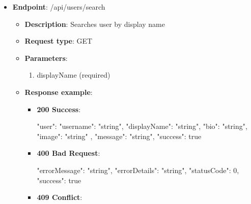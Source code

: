 \begin{itemize}
\begin{itemize}
\begin{itemize}
            \begin{spverbatim}
            {
                "errorMessage": "string",
                "errorDetails": "string",
                "statusCode": 0,
                "success": true
            }
            \end{spverbatim}
            \item \textbf{409 Conflict}:
            \begin{spverbatim}
            {
                "errorMessage": "string",
                "errorDetails": "string",
                "statusCode": 0,
                "success": true
            }
            \end{spverbatim}
        \end{itemize}
        \item \textbf{Response messages}:
        \begin{enumerate}
            \item Success.
            \item User not found.
        \end{enumerate}
    \end{itemize}
    \item \textbf{Endpoint}: /api/users/search
    \begin{itemize}
        \item \textbf{Description}: Searches user by display name
        \item \textbf{Request type}: GET
        \item \textbf{Parameters}:
        \begin{enumerate}
            \item displayName (required)
        \end{enumerate}
        \item \textbf{Response example}:
        \begin{itemize}
            \item \textbf{200 Success}:
            \begin{spverbatim}
            {
                "user": {
                    "username": "string",
                    "displayName": "string",
                    "bio": "string",
                    "image": "string"
                },
                "message": "string",
                "success": true
            }
            \end{spverbatim}
            \item \textbf{400 Bad Request}:
            \begin{spverbatim}
            {
                "errorMessage": "string",
                "errorDetails": "string",
                "statusCode": 0,
                "success": true
            }
            \end{spverbatim}
            \item \textbf{409 Conflict}:


\end{itemize}
\end{itemize}
\end{itemize}
